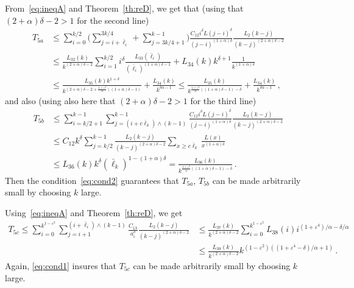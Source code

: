 \documentclass[AHL,Unicode,longabstracts]{cedram}
\newcommand{\ga}{\alpha}
\newcommand{\gd}{\delta}
\newcommand{\gep}{\varepsilon}
\begin{document}
From~\eqref{eq:ineqA} and Theorem~\ref{th:reD}, we get that (using that $(2+\ga)\gd -2>1$ for the second line)
\begin{equation}
\begin{split}
T_{5a} & \le \sum_{i=0}^{ k/2 } \bigg(\sum_{j=i + \bar \ell_i }^{ 3k/4} + \sum_{j= 3k/4+1 }^{k-1} \bigg) \frac{C_{12}i^{\gd}L(j-i)^{\gd}}{(j-i)^{(1+\ga) \delta }} \frac{L_2(k-j)}{(k-j)^{(2+\ga)\delta -2}} \\
& \le \frac{L_{32}(k)}{k^{(2+\ga)\gd -2}} \sum_{i=1}^{k/2} i^{\gd} \frac{L_{33}(\bar \ell_i)}{(\bar \ell_i)^{(1+\ga)\gd -1 }} +L_{34}(k) k^{\gd+1} \frac{1}{k^{(1+ \ga)\gd }} \\
&\le \frac{L_{35}(k) k^{1+\gd}}{k^{(2+\ga)\gd -2 + \tfrac{1+\gep^4}{\ga}((1+\ga)\gd-1)}}+ \frac{L_{34}(k)}{k^{\delta \ga -1 }} \leq \frac{L_{35}(k) }{ k^{\tfrac{1+\gep^4}{\ga}((1+\ga)\gd-1) -\gd }} + \frac{L_{34}(k)}{k^{\delta \ga -1 }}\,,
\end{split}
\end{equation}
and also (using also here that $(2+\ga)\gd -2>1$ for the third line)
\begin{equation}
\begin{split}
T_{5b} & \le \sum_{i= k/2+1}^{k-1} \sum_{j=(i+ c \bar \ell_k) \wedge (k-1)}^{k-1} \frac{C_{12} i^{\gd}L(j-i)^{\gd}}{(j-i)^{(1+\ga) \delta}} \frac{L_2(k-j)}{(k-j)^{(2+\ga)\delta -2}} \\
&\le C_{12} k^{\gd} \sum_{j=k/2}^{k-1} \frac{L_2(k-j)}{(k-j)^{(2+\ga)\delta -2}} \sum_{x\geq c \bar\ell_k}\frac{L(x)}{ x^{(1+\ga)\gd}} \\
& \le L_{36}(k) k^{\gd} (\bar\ell_k)^{1-(1+\ga)\gd} =\frac{L_{36}(k)}{k^{\tfrac{1+\gep^4}{\ga}((1+\ga)\gd -1) - \gd }}\,.
\end{split}
\end{equation}
Then the condition~\eqref{eq:cond2} guarantees that $T_{5a}$, $T_{5b}$ can be made arbitrarily small by choosing $k$ large.


Using~\eqref{eq:ineqA} and Theorem~\ref{th:reD}, we get
\begin{equation}
\begin{split}
T_{5c} \le \sum_{i=0}^{ k^{1- \gep^ 2} } \sum_{j=i + 1}^{(i+ \bar\ell_i) \wedge (k-1)} \frac{C_{13}}{a_i^{\gd}} \frac{L_2(k-j)}{(k-j)^{(2+\ga)\delta -2}} &\le \frac{L_{37}(k)}{k^{(2+\ga) \delta -2}} \sum_{i=0}^{ k^{1- \gep^ 2} } L_{38}(i) i^{(1+\gep^4)/\ga -\gd/\ga} \\
& \le \frac{L_{39}(k)}{k^{(2+\ga) \delta -2}} k^{(1-\gep^2) ((1+\gep^4-\gd)/\ga +1) }\,.
\end{split}
\end{equation}
Again, \eqref{eq:cond1} insures that $T_{5c}$ can be made arbitrarily small by choosing $k$ large.
\end{document}
